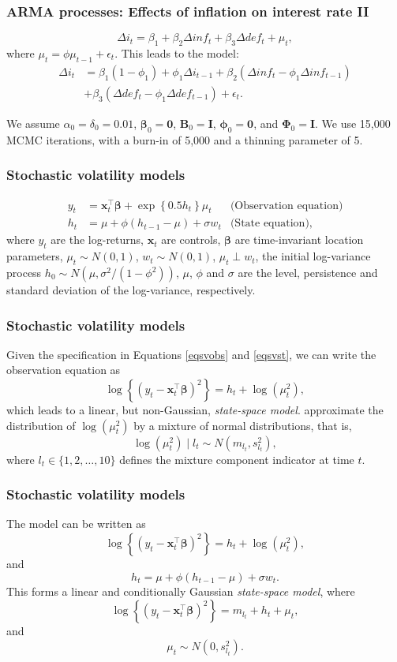 \documentclass[12pt, compress]{beamer}
\begin{document}
\begin{frame}
	\frametitle{ARMA processes: Effects of inflation on interest rate II}
\[
\Delta i_t = \beta_{1} + \beta_{2} \Delta inf_t + \beta_{3} \Delta def_t + \mu_t,
\]
where \(\mu_t = \phi \mu_{t-1} + \epsilon_t\). This leads to the model:
\begin{align*}
    \Delta i_t & = \beta_{1}(1-\phi_1) + \phi_1 \Delta i_{t-1} + \beta_{2}(\Delta inf_t - \phi_1 \Delta inf_{t-1})\\
    & + \beta_{3}(\Delta def_t - \phi_1 \Delta def_{t-1}) + \epsilon_t.
\end{align*}

We assume \(\alpha_0 = \delta_0 = 0.01\), \(\bm{\beta}_0 = \bm{0}\), \(\bm{B}_0 = \bm{I}\), \(\bm{\phi}_0 = \bm{0}\), and \(\bm{\Phi}_0 = \bm{I}\). We use 15,000 MCMC iterations, with a burn-in of 5,000 and a thinning parameter of 5.
\end{frame}

\begin{frame}
	\frametitle{Stochastic volatility models}
\begin{align}
	y_t&=\bm{x}_t^{\top}\bm{\beta}+\exp\left\{0.5h_t\right\}\mu_t& \text{(Observation equation)}\label{eqsvobs}\\
	h_t&=\mu+\phi(h_{t-1}-\mu)+\sigma w_t& \text{(State equation)}\label{eqsvst},
\end{align}
where $y_t$ are the log-returns, $\bm{x}_t$ are controls, $\bm{\beta}$ are time-invariant location parameters, $\mu_t\sim N(0,1)$, $w_t\sim N(0,1)$, $\mu_t\perp w_t$, the initial log-variance process $h_0\sim N(\mu, \sigma^2/(1-\phi^2))$, $\mu$, $\phi$ and $\sigma$ are the level, persistence and standard deviation of the log-variance, respectively.
\end{frame}

\begin{frame}
	\frametitle{Stochastic volatility models}
Given the specification in Equations \ref{eqsvobs} and \ref{eqsvst}, we can write the observation equation as 
\[
\log\left\{(y_t-\bm{x}_t^{\top}\bm{\beta})^2\right\} = h_t + \log(\mu_t^2),
\]
which leads to a linear, but non-Gaussian, \textit{state-space model}. \cite{kastner2014ancillarity} approximate the distribution of $\log(\mu_t^2)$ by a mixture of normal distributions, that is, 
\[
\log(\mu_t^2)\mid l_t \sim N(m_{l_t},s_{l_t}^2),
\]
where $l_t \in \{1, 2, \dots, 10\}$ defines the mixture component indicator at time $t$.
\end{frame}

\begin{frame}
	\frametitle{Stochastic volatility models}
The model can be written as
\[
\log\left\{(y_t-\bm{x}_t^{\top}\bm{\beta})^2\right\} = h_t + \log(\mu_t^2),
\]
and
\[
h_t = \mu + \phi(h_{t-1} - \mu) + \sigma w_t.
\]
This forms a linear and conditionally Gaussian \textit{state-space model}, where
\[
\log\left\{(y_t-\bm{x}_t^{\top}\bm{\beta})^2\right\} = m_{l_t} + h_t + \mu_t,
\]
and
\[
\mu_t \sim N(0, s_{l_t}^2).
\]

\end{frame}
\end{document}
